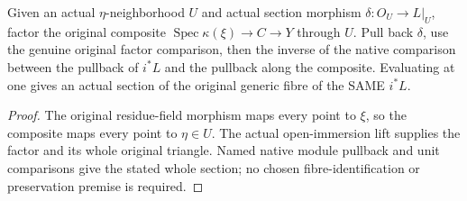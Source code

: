 \begin{definition}
\label{def:central-generic-original-local-section-value}
\leanok
Given an actual $\eta$-neighborhood $U$ and actual section morphism
$\delta:O_U\to L|_U$, factor the original composite
$\operatorname{Spec}\kappa(\xi)\to C\to Y$ through $U$.  Pull back
$\delta$, use the genuine original factor comparison, then the inverse
of the native comparison between the pullback of $i^*L$ and the pullback
along the composite.  Evaluating at one gives an actual section of the
original generic fibre of the SAME $i^*L$.
\end{definition}
\begin{proof}
The original residue-field morphism maps every point to $\xi$, so the
composite maps every point to $\eta\in U$.  The actual open-immersion
lift supplies the factor and its whole original triangle.  Named native
module pullback and unit comparisons give the stated whole section; no
chosen fibre-identification or preservation premise is required.
\end{proof}

